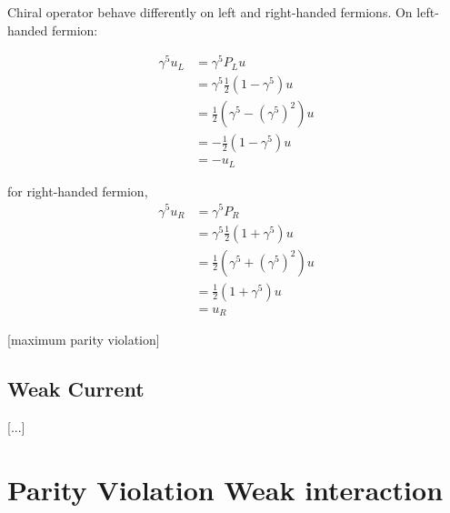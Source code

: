 Chiral operator behave differently on left and right-handed fermions. On left-handed fermion: 

\begin{equation}
\begin{split}
    \gamma^5u_L &= \gamma^5P_Lu \\
     &= \gamma^5 \frac{1}{2}(1-\gamma^5)u \\
     &= \frac{1}{2}(\gamma^5 - (\gamma^5)^2)u \\
     &= - \frac{1}{2}(1 - \gamma^5)u \\
     &= - u_L
\end{split}
\end{equation}

for right-handed fermion, 
\begin{equation}
\begin{split}
\gamma^5u_R &= \gamma^5P_R \\
     &= \gamma^5 \frac{1}{2}(1+\gamma^5)u \\
     &= \frac{1}{2}(\gamma^5 + (\gamma^5)^2)u \\
     &= \frac{1}{2}(1 + \gamma^5)u \\
     &= u_R
\end{split}
\end{equation}

 [maximum  parity violation]
 
\subsection{Weak Current}

[...]

\section{Parity Violation Weak interaction}


